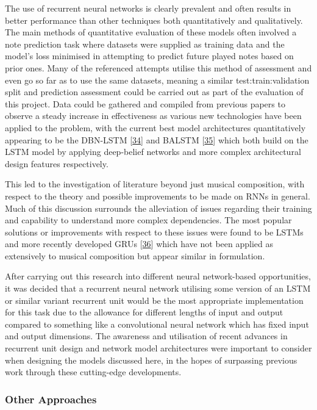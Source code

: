 \documentclass[12pt,]{article}
\begin{document}
The use of recurrent neural networks is clearly prevalent and often
results in better performance than other techniques both quantitatively
and qualitatively. The main methods of quantitative evaluation of these
models often involved a note prediction task where datasets were
supplied as training data and the model's loss minimised in attempting
to predict future played notes based on prior ones. Many of the
referenced attempts utilise this method of assessment and even go so far
as to use the same datasets, meaning a similar test:train:validation
split and prediction assessment could be carried out as part of the
evaluation of this project. Data could be gathered and compiled from
previous papers to observe a steady increase in effectiveness as various
new technologies have been applied to the problem, with the current best
model architectures quantitatively appearing to be the DBN-LSTM
{[}\protect\hyperlink{ref-vohra2015modeling}{34}{]} and BALSTM
{[}\protect\hyperlink{ref-johnson2017generating}{35}{]} which both build
on the LSTM model by applying deep-belief networks and more complex
architectural design features respectively.

This led to the investigation of literature beyond just musical
composition, with respect to the theory and possible improvements to be
made on RNNs in general. Much of this discussion surrounds the
alleviation of issues regarding their training and capability to
understand more complex dependencies. The most popular solutions or
improvements with respect to these issues were found to be LSTMs and
more recently developed GRUs
{[}\protect\hyperlink{ref-cho2014learning}{36}{]} which have not been
applied as extensively to musical composition but appear similar in
formulation.

After carrying out this research into different neural network-based
opportunities, it was decided that a recurrent neural network utilising
some version of an LSTM or similar variant recurrent unit would be the
most appropriate implementation for this task due to the allowance for
different lengths of input and output compared to something like a
convolutional neural network which has fixed input and output
dimensions. The awareness and utilisation of recent advances in
recurrent unit design and network model architectures were important to
consider when designing the models discussed here, in the hopes of
surpassing previous work through these cutting-edge developments.

\hypertarget{other-approaches}{%
\subsubsection{Other Approaches}\label{other-approaches}}
\end{document}
